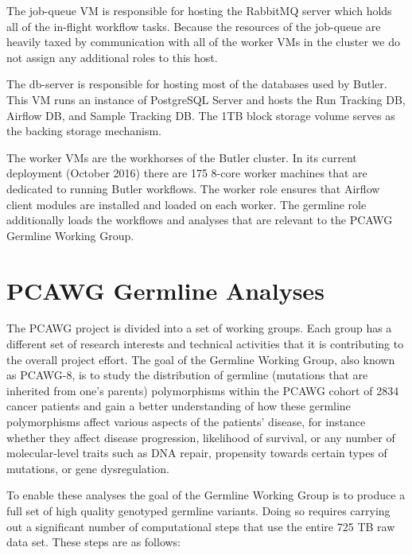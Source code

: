 The job-queue VM is responsible for hosting the RabbitMQ server which holds all of the in-flight workflow tasks. Because the resources of the job-queue are heavily taxed by communication with all of the worker VMs in the cluster we do not assign any additional roles to this host.

The db-server is responsible for hosting most of the databases used by Butler. This VM runs an instance of PostgreSQL Server and hosts the Run Tracking DB, Airflow DB, and Sample Tracking DB. The 1TB block storage volume serves as the backing storage mechanism. 

The worker VMs are the workhorses of the Butler cluster. In its current deployment (October 2016) there are 175 8-core worker machines that are dedicated to running Butler workflows. The worker role ensures that Airflow client modules are installed and loaded on each worker. The germline role additionally loads the workflows and analyses that are relevant to the PCAWG Germline Working Group. 


\section{PCAWG Germline Analyses}

The PCAWG project is divided into a set of working groups. Each group has a different set of research interests and technical activities that it is contributing to the overall project effort.  The goal of the Germline Working Group, also known as PCAWG-8, is to study the distribution of germline (mutations that are inherited from one's parents) polymorphisms within the PCAWG cohort of 2834 cancer patients and gain a better understanding of how these germline polymorphisms affect various aspects of the patients' disease, for instance whether they affect disease progression, likelihood of survival, or any number of molecular-level traits such as DNA repair, propensity towards certain types of mutations, or gene dysregulation.

To enable these analyses the goal of the Germline Working Group is to produce a full set of high quality genotyped germline variants. Doing so requires carrying out a significant number of computational steps that use the entire 725 TB raw data set. These steps are as follows:

